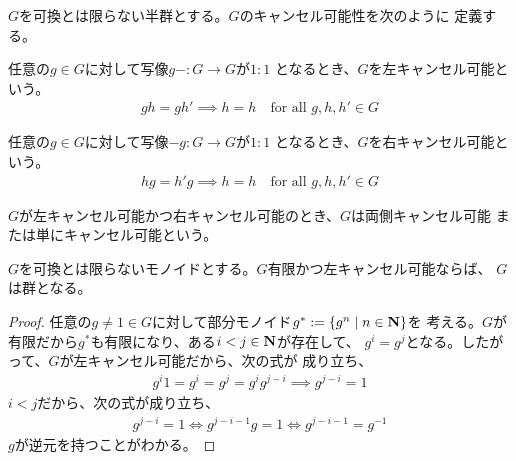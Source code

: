 {	\begin{definition}[キャンセル可能性]\label{def:キャンセル可能性} %
		$G$を可換とは限らない半群とする。$G$のキャンセル可能性を次のように
		定義する。
		\begin{description}\setlength{\itemsep}{-1mm} %
			\item[左キャンセル可能] 任意の$g\in G$に対して写像$g-:G\to G$が$1:1$
			となるとき、$G$を左キャンセル可能という。
			\begin{equation*}\begin{split}
				gh=gh'\implies h=h \quad\text{for all } g,h,h'\in G
			\end{split}\end{equation*}
			\item[見キャンセル可能] 任意の$g\in G$に対して写像$-g:G\to G$が$1:1$
			となるとき、$G$を右キャンセル可能という。
			\begin{equation*}\begin{split}
				hg=h'g\implies h=h \quad\text{for all } g,h,h'\in G
			\end{split}\end{equation*}
		\end{description} %
		$G$が左キャンセル可能かつ右キャンセル可能のとき、$G$は両側キャンセル可能
		または単にキャンセル可能という。\EOP
	\end{definition} %

	\begin{proposition}[キャンセル可能性と群]
	\label{prop:キャンセル可能性と群} %
		$G$を可換とは限らないモノイドとする。$G$有限かつ左キャンセル可能ならば、
		$G$は群となる。
	\end{proposition} %
	\begin{proof} %
		任意の$g\neq1\in G$に対して部分モノイド$g^*:=\mathinner{\{{g^n\mid n\in\ensuremath{\mathbf{N}}}\}}$を
		考える。$G$が有限だから$g^*$も有限になり、ある$i<j\in\mathbf{N}$が存在して、
		$g^i=g^j$となる。したがって、$G$が左キャンセル可能だから、次の式が
		成り立ち、
		\begin{equation*}\begin{split}
			g^i1 = g^i = g^j = g^ig^{j-i} \implies g^{j-i}=1
		\end{split}\end{equation*}
		$i<j$だから、次の式が成り立ち、
		\begin{equation*}\begin{split}
			g^{j-i}=1 \iff g^{j-i-1}g = 1\iff g^{j-i-1} = g^{-1}
		\end{split}\end{equation*}
		$g$が逆元を持つことがわかる。
	\end{proof} %
}
